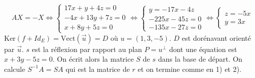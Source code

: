 {{$$AX=-X\Leftrightarrow\left\{
\begin{array}{l}
17x+y+4z=0\\
-4x+13y+7z=0\\
x+8y+5z=0
\end{array}
\right.\Leftrightarrow\left\{
\begin{array}{l}
y=-17x-4z\\
-225x-45z=0\\
-135x-27z=0
\end{array}
\right.\Leftrightarrow\left\{
\begin{array}{l}
z=-5x\\
y=3x
\end{array}\right.$$
$\mbox{Ker}(f+Id_E)=\mbox{Vect}(\overrightarrow{u})=D$ où $u=(1,3,-5)$. $D$ est dorénavant orienté par $\overrightarrow{u}$.
$s$ est la réflexion par rapport au plan $P=u^\bot$ dont une équation est $x+3y-5z=0$.
On écrit alors la matrice $S$ de $s$ dans la base de départ. On calcule $S^{-1}A=SA$ qui est la matrice de $r$ et on termine comme en 1) et 2).
}
}
